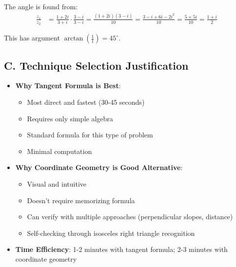 \documentclass[12pt]{article}
\begin{document}
\begin{techniquesbox}
\begin{itemize}[leftmargin=*]
    The angle is found from:
    \begin{align*}
    \frac{z_1}{z_2} &= \frac{1+2i}{3+i} \cdot \frac{3-i}{3-i} = \frac{(1+2i)(3-i)}{10} = \frac{3-i+6i-2i^2}{10} = \frac{5+5i}{10} = \frac{1+i}{2}
    \end{align*}
    
    This has argument $\arctan\left(\frac{1}{1}\right) = 45^\circ$.
\end{itemize}

\subsection*{C. Technique Selection Justification}
\begin{itemize}[leftmargin=*]
    \item \textbf{Why Tangent Formula is Best}: 
    \begin{itemize}
        \item Most direct and fastest (30-45 seconds)
        \item Requires only simple algebra
        \item Standard formula for this type of problem
        \item Minimal computation
    \end{itemize}
    \item \textbf{Why Coordinate Geometry is Good Alternative}:
    \begin{itemize}
        \item Visual and intuitive
        \item Doesn't require memorizing formula
        \item Can verify with multiple approaches (perpendicular slopes, distance)
        \item Self-checking through isosceles right triangle recognition
    \end{itemize}
    \item \textbf{Time Efficiency}: 1-2 minutes with tangent formula; 2-3 minutes with coordinate geometry
\end{itemize}
\end{techniquesbox}
\end{document}
